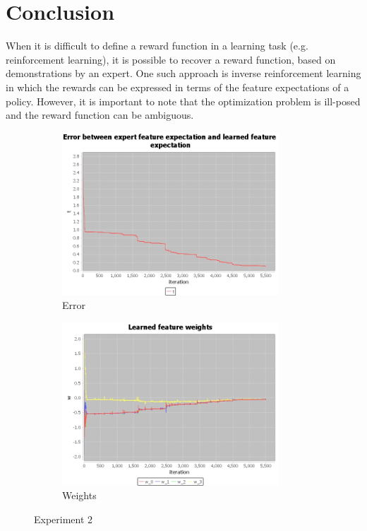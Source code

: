\documentclass[10pt,a4paper,twocolumn]{article}
\begin{document}
\section{Conclusion}
When it is difficult to define a reward function in a learning task (e.g. reinforcement learning), it is possible to recover a reward function, based on demonstrations by an expert. One such approach is inverse reinforcement learning in which the rewards can be expressed in terms of the feature expectations of a policy. However, it is important to note that the optimization problem is ill-posed and the reward function can be ambiguous.

\newpage

\begin{figure}[h]
\begin{subfigure}[b]{0.5\textwidth}
	\includegraphics[width=\textwidth]{experiment_2_t}
	\caption{Error}
	\label{fig:experiment2t}
\end{subfigure}
\begin{subfigure}[b]{0.5\textwidth}
	\includegraphics[width=\textwidth]{experiment_2_w}
	\caption{Weights}
	\label{fig:experiment2w}
\end{subfigure}
\caption{Experiment 2}
\end{figure}

\newpage

 

\end{document}
